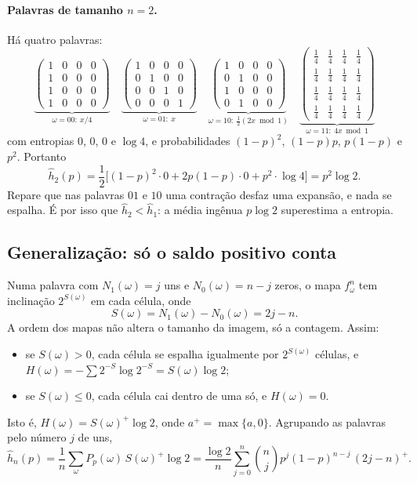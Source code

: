 \paragraph{Palavras de tamanho $n=2$.} Há quatro palavras:
\[
  \underbrace{\begin{pmatrix}1&0&0&0\\1&0&0&0\\1&0&0&0\\1&0&0&0\end{pmatrix}}_{\omega=00:\ x/4}
  \quad
  \underbrace{\begin{pmatrix}1&0&0&0\\0&1&0&0\\0&0&1&0\\0&0&0&1\end{pmatrix}}_{\omega=01:\ x}
  \quad
  \underbrace{\begin{pmatrix}1&0&0&0\\0&1&0&0\\1&0&0&0\\0&1&0&0\end{pmatrix}}_{\omega=10:\ \frac12(2x\bmod1)}
  \quad
  \underbrace{\begin{pmatrix}\tfrac14&\tfrac14&\tfrac14&\tfrac14\\\tfrac14&\tfrac14&\tfrac14&\tfrac14\\
  \tfrac14&\tfrac14&\tfrac14&\tfrac14\\\tfrac14&\tfrac14&\tfrac14&\tfrac14\end{pmatrix}}_{\omega=11:\ 4x\bmod1}
\]
com entropias $0$, $0$, $0$ e $\log4$, e probabilidades $(1-p)^2$, $(1-p)p$, $p(1-p)$ e $p^2$.
Portanto
\[
  \hat h_2(p)=\frac12\Big[(1-p)^2\cdot0+2p(1-p)\cdot0+p^2\cdot\log4\Big]=p^2\log2 .
\]
Repare que nas palavras $01$ e $10$ uma contração desfaz uma expansão, e nada se espalha. É por
isso que $\hat h_2<\hat h_1$: a média ingênua $p\log 2$ superestima a entropia.

\subsection{Generalização: só o saldo positivo conta}
\label{subsec:pelikan-geral}

Numa palavra com $N_1(\omega)=j$ uns e $N_0(\omega)=n-j$ zeros, o mapa $f^n_\omega$ tem
inclinação $2^{S(\omega)}$ em cada célula, onde
\[
  S(\omega)=N_1(\omega)-N_0(\omega)=2j-n .
\]
A ordem dos mapas não altera o tamanho da imagem, só a contagem. Assim:
\begin{itemize}
  \item se $S(\omega)>0$, cada célula se espalha igualmente por $2^{S(\omega)}$ células, e
        $H(\omega)=-\sum 2^{-S}\log2^{-S}=S(\omega)\log 2$;
  \item se $S(\omega)\le0$, cada célula cai dentro de uma só, e $H(\omega)=0$.
\end{itemize}
Isto é, $H(\omega)=S(\omega)^+\log2$, onde $a^+=\max\{a,0\}$. Agrupando as palavras pelo número
$j$ de uns,
\[
  \hat h_n(p)=\frac1n\sum_\omega P_p(\omega)\,S(\omega)^+\log2
  =\frac{\log2}{n}\sum_{j=0}^{n}\binom nj p^j(1-p)^{n-j}\,(2j-n)^+ .
\]

